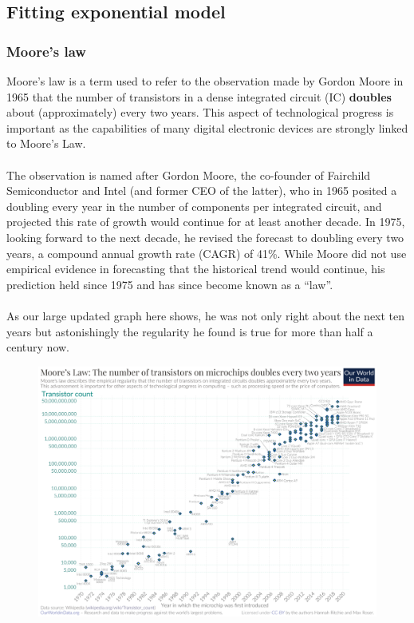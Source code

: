 \documentclass[a4paper]{article}
\begin{document}
\subsection{Fitting exponential model}
\subsubsection{Moore's law}
Moore's law is a term used to refer to the observation made by Gordon Moore in 1965 that the number of transistors in a dense integrated circuit (IC) \textbf{doubles} about (approximately) every two years. This aspect of technological progress is important as the capabilities of many digital electronic devices are strongly linked to Moore’s Law.\\\\
The observation is named after Gordon Moore, the co-founder of Fairchild Semiconductor and Intel (and former CEO of the latter), who in 1965 posited a doubling every year in the number of components per integrated circuit, and projected this rate of growth would continue for at least another decade. In 1975, looking forward to the next decade, he revised the forecast to doubling every two years, a compound annual growth rate (CAGR) of 41\%. While Moore did not use empirical evidence in forecasting that the historical trend would continue, his prediction held since 1975 and has since become known as a “law”.\\\\
As our large updated graph here shows, he was not only right about the next ten years but astonishingly the regularity he found is true for more than half a century now.
\begin{figure}[H]
    \centering
    \includegraphics[keepaspectratio, width=1\textwidth, height=1\textheight]{EM/Moore_law.png}
\end{figure}
\end{document}
